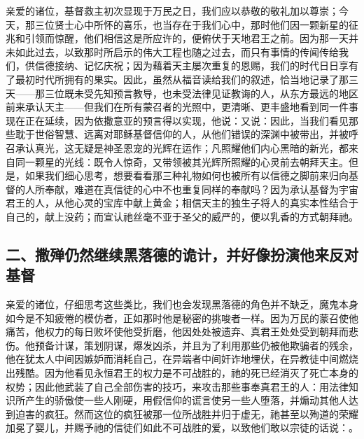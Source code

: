亲爱的诸位，基督救主初次显现于万民之日，我们应以恭敬的敬礼加以尊崇；今天，那三位贤士心中所怀的喜乐，也当存在于我们心中，那时他们因一颗新星的征兆和引领而惊醒，他们相信这是所应许的，便俯伏于天地君王之前。因为那一天并未如此过去，以致那时所启示的伟大工程也随之过去，而只有事情的传闻传给我们，供信德接纳、记忆庆祝；因为藉着天主屡次重复的恩赐，我们的时代日日享有了最初时代所拥有的果实。因此，虽然从福音读给我们的叙述，恰当地记录了那三天——那三位既未受先知预言教导，也未受法律见证教诲的人，从东方最远的地区前来承认天主——但我们在所有蒙召者的光照中，更清晰、更丰盛地看到同一件事现在正在延续，因为依撒意亚的预言得以实现，他说：又说：因此，当我们看见那些耽于世俗智慧、远离对耶稣基督信仰的人，从他们错误的深渊中被带出，并被呼召承认真光，这无疑是神圣恩宠的光辉在运作；凡照耀他们内心黑暗的新光，都来自同一颗星的光线：既令人惊奇，又带领被其光辉所照耀的心灵前去朝拜天主。但是，如果我们细心思考，想要看看那三种礼物如何也被所有以信德之脚前来归向基督的人所奉献，难道在真信徒的心中不也重复同样的奉献吗？因为承认基督为宇宙君王的人，从他心灵的宝库中献上黄金；相信天主的独生子将人的真实本性结合于自己的，献上没药；而宣认祂丝毫不亚于圣父的威严的，便以乳香的方式朝拜祂。\par


\subsection{二、撒殚仍然继续黑落德的诡计，并好像扮演他来反对基督}

亲爱的诸位，仔细思考这些类比，我们也会发现黑落德的角色并不缺乏，魔鬼本身如今是不知疲倦的模仿者，正如那时他是秘密的挑唆者一样。因为万民的蒙召使他痛苦，他权力的每日败坏使他受折磨，他因处处被遗弃、真君王处处受到朝拜而悲伤。他预备计谋，策划阴谋，爆发凶杀，并且为了利用那些仍被他欺骗者的残余，他在犹太人中间因嫉妒而消耗自己，在异端者中间奸诈地埋伏，在异教徒中间燃烧出残酷。因为他看见永恒君王的权力是不可战胜的，祂的死已经消灭了死亡本身的权势；因此他武装了自己全部伤害的技巧，来攻击那些事奉真君王的人：用法律知识所产生的骄傲使一些人刚硬，用假信仰的谎言使另一些人堕落，并煽动其他人达到迫害的疯狂。然而这位的疯狂被那一位所战胜并归于虚无，祂甚至以殉道的荣耀加冕了婴儿，并赐予祂的信徒们如此不可战胜的爱，以致他们敢以宗徒的话说：。\par

